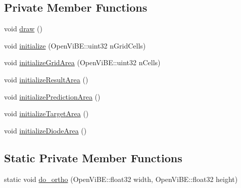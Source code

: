 \subsection*{Private Member Functions}
\begin{DoxyCompactItemize}
\item 
void \hyperlink{classOpenViBEApplications_1_1P300MainContainer_a4a7058842de36b427233d89cd49be17c}{draw} ()
\item 
void \hyperlink{classOpenViBEApplications_1_1P300MainContainer_a2ae18d5fd4a152d3d9d26c50adb0408b}{initialize} (OpenViBE::uint32 nGridCells)
\item 
void \hyperlink{classOpenViBEApplications_1_1P300MainContainer_a8279db3f4477509970b60cfedff68e64}{initializeGridArea} (OpenViBE::uint32 nCells)
\item 
void \hyperlink{classOpenViBEApplications_1_1P300MainContainer_ad40989824595a34377d872f8276655de}{initializeResultArea} ()
\item 
void \hyperlink{classOpenViBEApplications_1_1P300MainContainer_aa33fa6df9f8f7b40666ab6bb46302e80}{initializePredictionArea} ()
\item 
void \hyperlink{classOpenViBEApplications_1_1P300MainContainer_a94b22557a1154c40670a4f9bd5108602}{initializeTargetArea} ()
\item 
void \hyperlink{classOpenViBEApplications_1_1P300MainContainer_a0f2db451575ab86dacaa6bedf0762732}{initializeDiodeArea} ()
\end{DoxyCompactItemize}
\subsection*{Static Private Member Functions}
\begin{DoxyCompactItemize}
\item 
static void \hyperlink{classOpenViBEApplications_1_1P300MainContainer_a29b9524de3e6d6e8b36475b51e449077}{do\_\-ortho} (OpenViBE::float32 width, OpenViBE::float32 height)
\end{DoxyCompactItemize}
